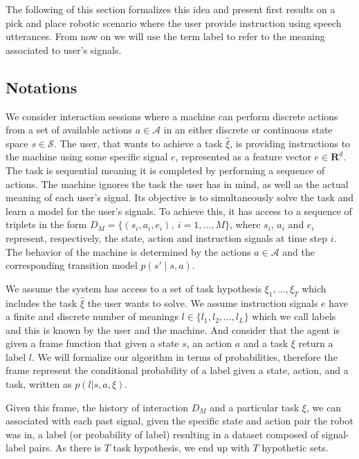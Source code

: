 The following of this section formalizes this idea and present first results on a pick and place robotic scenario where the user provide instruction using speech utterances. From now on we will use the term label to refer to the meaning associated to user's signals.

\subsection{Notations}

We consider interaction sessions where a machine can perform discrete actions from a set of available actions $a \in \mathcal{A}$ in an either discrete or continuous state space $s \in \mathcal{S}$. The user, that wants to achieve a task $\hat{\xi}$, is providing instructions to the machine using some specific signal $e$, represented as a feature vector  $e \in \mathbf{R}^d$. The task is sequential meaning it is completed by performing a sequence of actions. The machine ignores the task the user has in mind, as well as the actual meaning of each user's signal. Its objective is to simultaneously solve the task and learn a model for the user's signals. To achieve this, it has access to a sequence of triplets in the form $D_M = \{(s_i, a_i, e_i),\ i = 1,\ldots,M\}$, where $s_i$, $a_i$ and $e_i$ represent, respectively, the state, action and instruction signals at time step $i$. The behavior of the machine is determined by the actions $a\in\mathcal{A}$ and the corresponding transition model $p(s'\mid s,a)$.

We assume the system has access to a set of task hypothesis $\xi_1,\ldots,\xi_T$ which includes the task $\hat{\xi}$ the user wants to solve. We assume instruction signals $e$ have a finite and discrete number of meanings $l \in \{l_1, l_2, \ldots, l_L\}$ which we call labels and this is known by the user and the machine. And consider that the agent is given a frame function that given a state $s$, an action $a$ and a task $\xi$ return a label $l$. We will formalize our algorithm in terms of probabilities, therefore the frame represent the conditional probability of a label given a state, action, and a task, written as $p(l | s, a, \xi)$.

Given this frame, the history of interaction $D_M$ and a particular task $\xi$, we can associated with each past signal, given the specific state and action pair the robot was in, a label (or probability of label) resulting in a dataset composed of signal-label pairs. As there is $T$ task hypothesis, we end up with $T$ hypothetic sets. 

